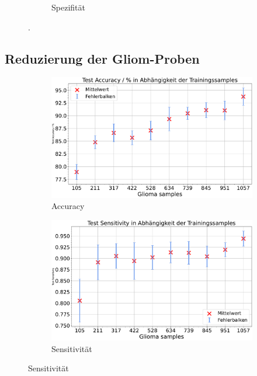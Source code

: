 \begin{figure}[htbp]
\begin{subfigure}[b]{0.48\textwidth}
    \caption{Spezifität}
    \label{fig:augm-spec}
  \end{subfigure}
  \caption{.}
  \label{fig:gli-men-augm}
\end{figure}


\subsection{Reduzierung der Gliom-Proben}
\begin{figure}[htbp]
  \centering
  \begin{subfigure}[b]{0.48\textwidth}
    \centering
    \includegraphics[width=\textwidth]{plots/Reduzierung-Gli + Balnce_Accuracy_mean.pdf}
    \caption{Accuracy}
    \label{fig:gli-red-acc}
  \end{subfigure}
  \begin{subfigure}[b]{0.48\textwidth}
    \centering
    \includegraphics[width=\textwidth]{plots/Reduzierung-Gli + Balnce_Sensitivity_mean.pdf}
    \caption{Sensitivität}
    \label{fig:gli-red-sens}
  \end{subfigure}

\end{figure}
